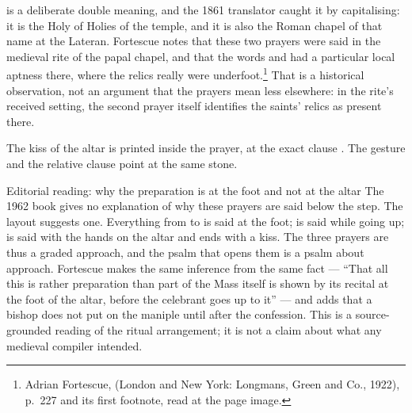 is a deliberate double meaning, and the 1861
translator caught it by capitalising: it is the Holy of Holies of the temple,
and it is also the Roman chapel of that name at the Lateran. Fortescue notes
that these two prayers were said in the medieval rite of the papal chapel, and
that the words  and  had a particular local aptness there, where the relics really were
underfoot.\footnote{Adrian Fortescue,  (London and New York: Longmans, Green and Co., 1922), p.~227 and its
first footnote, read at the page image.} That is a historical observation, not
an argument that the prayers mean less elsewhere: in the rite's received
setting, the second prayer itself identifies the saints' relics as present
there.

The kiss of the altar is printed inside the prayer, at the exact clause
. The gesture and the relative clause point
at the same stone.

\begin{proposal}{Editorial reading: why the preparation is at the foot and not at the altar}
The 1962 book gives no explanation of why these prayers are said below the
step. The layout suggests one. Everything from  to
 is said at the foot;  is
said while going up;  is said with the hands on the altar
and ends with a kiss. The three prayers are thus a graded approach, and the
psalm that opens them is a psalm about approach. Fortescue makes the same
inference from the same fact --- ``That all this is rather preparation than
part of the Mass itself is shown by its recital at the foot of the altar,
before the celebrant goes up to it'' --- and adds that a bishop does not put on
the maniple until after the confession. This is a source-grounded reading of
the ritual arrangement; it is not a claim about what any medieval compiler
intended.
\end{proposal}
